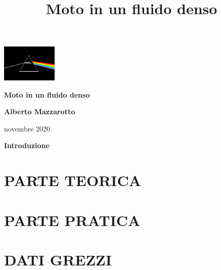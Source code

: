 \documentclass[11pt]{article}
\title{Moto in un fluido denso}
\begin{document}
\pagestyle{fancy}
   \lhead{}\rhead{}
   \lfoot{\textcolor{light-gray}{\small Moto in un fluido denso}}
        \cfoot{{\thepage}}
        \rfoot{}
  \renewcommand{\headrulewidth}{0pt}




\newpage
\phantom{22}
\vspace{-3cm}

\begin{center}
\includegraphics[width=100px]{images/logo.jpg}

\bigskip
\bigskip


\bigskip
{\fontsize{15}{10}\selectfont 
\bigskip


\bigskip
\medskip
{ \textbf{\Huge Moto in un fluido denso \\}}}


\bigskip
\medskip
{ \textbf{ Alberto Mazzarotto}}
\bigskip

\end{center}

\bigskip
\bigskip

\thispagestyle{empty}


\begin{center}
{\Large novembre 2020}
\end{center}


\linespread{1.5}

\newpage\setlength{\parskip}{3mm} 
\onehalfspacing
\bigskip
{}
\setcounter{page}{1}

\begin{center}

{\LARGE \bf Introduzione}

\end{center}


\newpage

\setlength{\parskip}{1mm} 

\tableofcontents
\listoffigures


\newpage \setlength{\parskip}{3mm}
\phantom{ss}
\vspace{-2.5cm}
\sectionfont{\centering}

\renewcommand{\thesection}{\arabic{section}.}

\setcounter{page}{1}

\section{PARTE TEORICA}


\newpage

\section{PARTE PRATICA}


\newpage

\section{DATI GREZZI}

\end{document}
